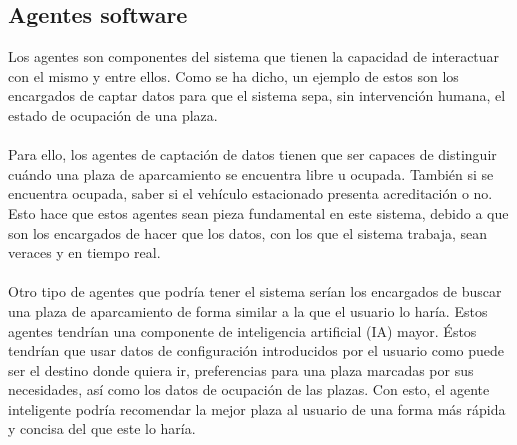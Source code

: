 \subsection{Agentes software}
Los agentes son componentes del sistema que tienen la capacidad de interactuar con el mismo y entre ellos. Como se ha dicho, un ejemplo de estos son los encargados de captar datos para que el sistema sepa, sin intervención humana, el estado de ocupación de una plaza.
\\\\
Para ello, los agentes de captación de datos tienen que ser capaces de distinguir cuándo una plaza de aparcamiento se encuentra libre u ocupada. También si se encuentra ocupada, saber si el vehículo estacionado presenta acreditación o no. Esto hace que estos agentes sean pieza fundamental en este sistema, debido a que son los encargados de hacer que los datos, con los que el sistema trabaja, sean veraces y en tiempo real.
\\\\
Otro tipo de agentes que podría tener el sistema serían los encargados de buscar una plaza de aparcamiento de forma similar a la que el usuario lo haría.  Estos agentes tendrían una componente de inteligencia artificial (IA) mayor. Éstos tendrían que usar datos de configuración introducidos por el usuario como puede ser el destino donde quiera ir, preferencias para una plaza marcadas por sus necesidades, así como los datos de ocupación de las plazas. Con esto, el agente inteligente podría recomendar la mejor plaza al usuario de una forma más rápida y concisa del que este lo haría.

